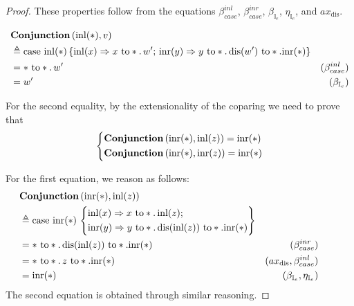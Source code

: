   \begin{proof}
    These properties follow from the equations $\beta_{case}^{inl}$, $\beta_{case}^{inr}$, $\beta_{\mathbb{I}_{e}}$, $\eta_{\mathbb{I}_{e}}$, and $ax_\text{dis}$.

    \begin{equation*}
    \begin{split}
      & \textbf{Conjunction} \, (\mathrm{inl}(*),v) \\
      & \triangleq  \text{case } \mathrm{inl}(*)\,
  \{\mathrm{inl}(x) \Rightarrow x \text{ to} *. \, w' ;
  \, \mathrm{inr}(y) \Rightarrow y \text{ to} *. \,  \text{dis}(w') \text{ to} *. \mathrm{inr}(*)
  \} \\
  & = * \text{ to} *. \, w' & (\beta_{case}^{inl}) \\
  & = w' & (\beta_{\mathbb{I}_{e}}) 
    \end{split}
    \end{equation*}

    For the second equality, by the extensionality of the coparing we need to prove that 
     \[
      \left\{
      \begin{aligned}
      &   \textbf{Conjunction} \, (\mathrm{inr}(*), \mathrm{inl}(z)) = \mathrm{inr}(*)  \\
      & \textbf{Conjunction} \, (\mathrm{inr}(*), \mathrm{inr}(z)) = \mathrm{inr}(*)
      \end{aligned}
      \right.
      \]

    For the first equation, we reason as follows:
    \begin{align*}
      & \hspace{-22pt} \textbf{Conjunction} \, (\inr(*), \inl(z)) \\
      & \hspace{-22pt}  \triangleq  \text{case } \inr(*)\,   \left\{\begin{aligned} 
 &\inl(x) \Rightarrow x \text{ to} *. \,  \inl(z) ; \\
  &\inr(y) \Rightarrow y \text{ to} *. \,  \text{dis}(\inl(z)) \text{ to} *. \inr(*) \end{aligned} 
  \right\} \\
  & \hspace{-22pt}  =  *  \text{ to} *. \,  \text{dis}(\inl(z)) \text{ to} *. \inr(*) & (\beta_{case}^{inr}) \\
  & \hspace{-22pt}  =  *  \text{ to} *. \, z \text{  to} *. \inr(*) & (ax_\text{dis}, \beta_{case}^{inl}) \\
  & \hspace{-22pt}  =  \inr(*) & (\beta_{\mathbb{I}_{e}},\eta_{\mathbb{I}_{e}}) \\
    \end{align*}
      The second equation is obtained through similar reasoning.
  \end{proof}


